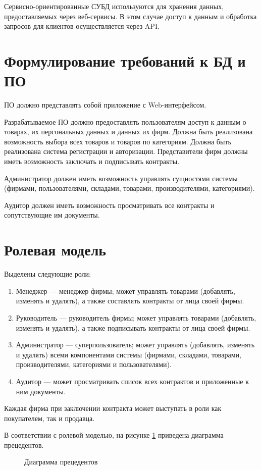 Сервисно-ориентированные СУБД используются для хранения данных, предоставляемых через веб-сервисы.
В этом случае доступ к данным и обработка запросов для клиентов осуществляется через API.

\section{Формулирование требований к БД и ПО}
ПО должно представлять собой приложение с Web-интерфейсом.

Разрабатываемое ПО должно предоставлять пользователям доступ к данным о товарах, их персональных данных и данных их фирм.
Должна быть реализована возможность выбора всех товаров и товаров по категориям.
Должна быть реализована система регистрации и авторизации.
Представители фирм должны иметь возможность заключать и подписывать контракты.

Администратор должен иметь возможность управлять сущностями системы (фирмами, пользователями, складами, товарами, производителями, категориями).

Аудитор должен иметь возможность просматривать все контракты и сопутствующие им документы.
\newpage
\section{Ролевая модель}
Выделены следующие роли:
\begin{enumerate}
	\item Менеджер --- менеджер фирмы; может управлять товарами (добавлять, изменять и удалять), а также составлять контракты от лица своей фирмы.
	\item Руководитель --- руководитель фирмы; может управлять товарами (добавлять, изменять и удалять), а также подписывать контракты от лица своей фирмы.
	\item Администратор --- суперпользователь; может управлять (добавлять, изменять и удалять) всеми компонентами системы (фирмами, складами, товарами, производителями, категориями и пользователями).
	\item Аудитор --- может просматривать список всех контрактов и приложенные к ним документы.
\end{enumerate}
Каждая фирма при заключении контракта может выступать в роли как покупателем, так и продавца.

В соответствии с ролевой моделью, на рисунке \ref{use_case} приведена диаграмма прецедентов.
\begin{figure}[h!]
	\center{}
	\caption{Диаграмма прецедентов}
	\label{use_case}
\end{figure}

